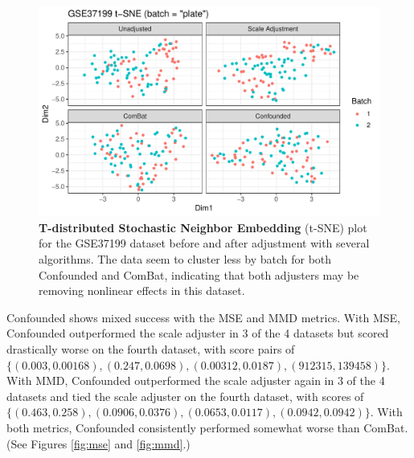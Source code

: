\documentclass[notitlepage]{article}
\begin{document}
\begin{figure}
	\centering
	\includegraphics[width=\columnwidth]{figures/final/tsne.pdf}
	\caption{\textbf{T-distributed Stochastic Neighbor Embedding} (t-SNE) plot for the GSE37199 dataset before and after adjustment with several algorithms.
	The data seem to cluster less by batch for both Confounded and ComBat, indicating that both adjusters may be removing nonlinear effects in this dataset.}
	\label{fig:tsne}
\end{figure}

Confounded shows mixed success with the MSE and MMD metrics.
With MSE, Confounded outperformed the scale adjuster in 3 of the 4 datasets but scored drastically worse on the fourth dataset, with score pairs of $\{(0.003, 0.00168), (0.247, 0.0698), (0.00312, 0.0187), (912315, 139458)\}$.
With MMD, Confounded outperformed the scale adjuster again in 3 of the 4 datasets and tied the scale adjuster on the fourth dataset, with scores of $\{(0.463, 0.258),(0.0906, 0.0376),(0.0653, 0.0117),(0.0942, 0.0942)\}$.
With both metrics, Confounded consistently performed somewhat worse than ComBat.
(See Figures \ref{fig:mse} and \ref{fig:mmd}.)
\end{document}
